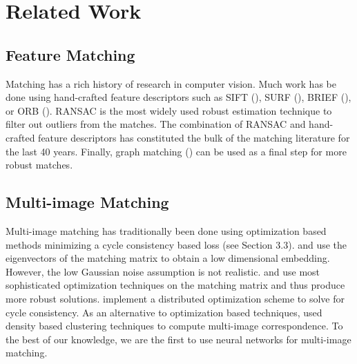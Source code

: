 \documentclass{article} %
\begin{document}
\section{Related Work}

\subsection{Feature Matching}
Matching has a rich history of research in computer vision.
Much work has be done using hand-crafted feature descriptors such as SIFT (\cite{lowe2004distinctive}), SURF (\cite{bay2006surf}), BRIEF (\cite{calonder2012brief}), or ORB (\cite{mur2015orb}).
RANSAC \cite{fischler1981random} is the most widely used robust estimation technique to filter out outliers from the matches.
The combination of RANSAC and hand-crafted feature descriptors has constituted the bulk of the matching literature for the last 40 years.
Finally, graph matching (\cite{suh2015subgraph, hu2016distributable}) can be used as a final step for more robust matches.

\subsection{Multi-image Matching}
Multi-image matching has traditionally been done using optimization based methods minimizing a cycle consistency based loss (see Section 3.3).
\cite{pachauri2013solving} and \cite{arrigoni2017synchronization} use the eigenvectors of the matching matrix to obtain a low dimensional embedding. 
However, the low Gaussian noise assumption is not realistic.
\cite{zhou2015multi} and \cite{wang2017multi} use most sophisticated optimization techniques on the matching matrix and thus produce more robust solutions.
\cite{leonardos2016distributed} implement a distributed optimization scheme to solve for cycle consistency.
As an alternative to optimization based techniques, \cite{tron2017fast} used density based clustering techniques to compute multi-image correspondence.
To the best of our knowledge, we are the first to use neural networks for multi-image matching.
\end{document}
